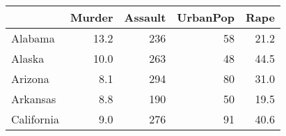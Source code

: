 \begin{tabular}{lrrrr}
\toprule
{} &  Murder &  Assault &  UrbanPop &  Rape \\
\midrule
Alabama    &    13.2 &      236 &        58 &  21.2 \\
Alaska     &    10.0 &      263 &        48 &  44.5 \\
Arizona    &     8.1 &      294 &        80 &  31.0 \\
Arkansas   &     8.8 &      190 &        50 &  19.5 \\
California &     9.0 &      276 &        91 &  40.6 \\
\bottomrule
\end{tabular}

